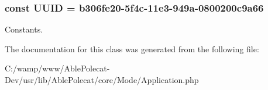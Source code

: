 \subsubsection[{U\+U\+I\+D}]{\setlength{\rightskip}{0pt plus 5cm}const U\+U\+I\+D = \textquotesingle{}b306fe20-\/5f4c-\/11e3-\/949a-\/0800200c9a66\textquotesingle{}}\label{class_able_polecat___mode___application_a74b892c8c0b86bf9d04c5819898c51e7}
Constants. 

The documentation for this class was generated from the following file\+:\begin{DoxyCompactItemize}
\item 
C\+:/wamp/www/\+Able\+Polecat-\/\+Dev/usr/lib/\+Able\+Polecat/core/\+Mode/Application.\+php\end{DoxyCompactItemize}
